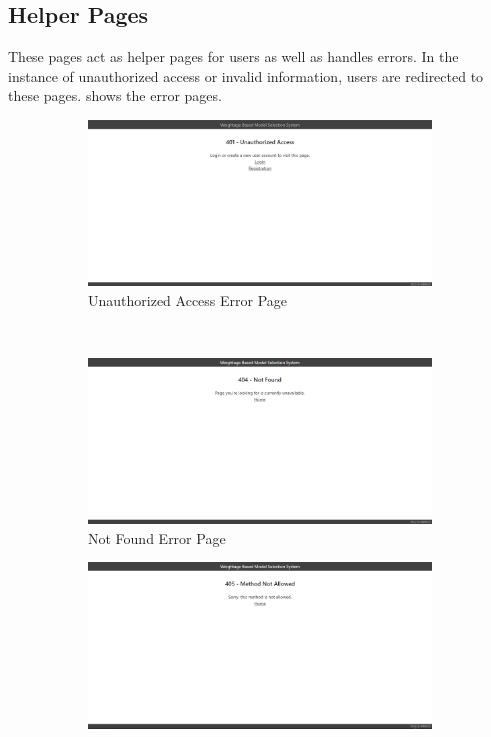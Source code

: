 \FloatBarrier
\subsection{Helper Pages} \label{subsec:helper_page}
These pages act as helper pages for users as well as handles errors. In the instance of unauthorized access or invalid information, users are redirected to these pages.  shows the error pages.

\begin{figure}[H]
  \centering
  \begin{subfigure}{.7\columnwidth}
    \includegraphics[width=\columnwidth]{media/website/pages/401.png}
    \caption{Unauthorized Access Error Page}
    \label{fig:401_page}
  \end{subfigure}\\
  \begin{subfigure}{.7\columnwidth}
    \includegraphics[width=\columnwidth]{media/website/pages/404.png}
    \caption{Not Found Error Page}
    \label{fig:404_page}
  \end{subfigure}
  \begin{subfigure}{.7\columnwidth}
    \includegraphics[width=\columnwidth]{media/website/pages/405.png}

\end{subfigure}
\end{figure}
